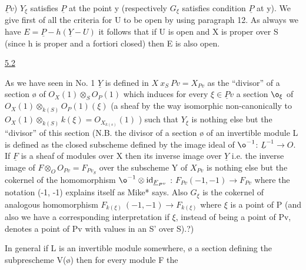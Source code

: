 
$\underline{P}v$) $Y_{\xi}$ satisfies $\underline{P}$ at the point y (respectively $G_{\xi}$ satisfies
condition $\underline{P}$ at y).  We give first of all the criteria for U to be
open by using paragraph 12.  As always we have $E = \underline{P} - h(\underline{Y} - U)$ it
follows that if U is open and X is proper over S (since h is
proper and a fortiori closed) then E is also open.

\uline{5.2}

As we have seen in No. 1 $\underline{Y}$ is defined in $X\ x_S\ Pv = X_{Pv}$ as the
``divisor'' of a section {\o} of $O_X(1) \otimes_S O_P(1)$ which induces for every
$\xi \in \underline{P}v$ a section ${\o}_{\xi}$ of $O_X(1) \otimes_{k(S)} O_P(1)(\xi)$ (a sheaf by the way
isomorphic non-canonically to $O_X(1) \otimes_{k(S)} k(\xi) = O_{X_{k(s)}}(1)$ )
such that $Y_{\xi}$ is nothing else but the ``divisor'' of this section
(N.B. the divisor of a section {\o} of an invertible module L is
defined as the closed subscheme defined by the image ideal of
${\o}^{-1}$: $\underline{L}^{-1} \to O$.  If $\underline{F}$ is a sheaf of modules over X then its inverse
image over $\underline{Y}$ i.e. the inverse image of $F \otimes_O O_{Pv} = F_{Pv_{S}}$ over
the subscheme Y of $X_{Pv}$ is nothing else but the cokernel of the
homomorphism ${\o}^{-1} \otimes \mathrm{id}_{\underline{F}_{P^v}}$ : $F_{Pv}(-1, -1) \to F_{Pv}$ where the
notation (-1, -1) explains itself as Mike* says.  Also $G_{\xi}$ is the
cokernel of analogous homomorphism $F_{k(\xi)}\ (-1, -1) \to F_{k(\xi)}$ where $\xi$ is
a point of P (and also we have a corresponding interpretation if $\xi$,
instead of being a point of Pv, denotes a point of Pv with values
in an S' over S).?)

In general if L is an invertible module somewhere, {\o} a
section defining the subprescheme V({\o}) then for every module F the
